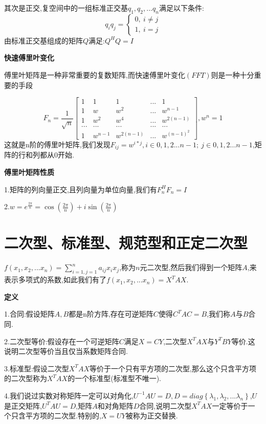 \documentclass[oneside]{book}
\begin{document}
	其次是正交,复空间中的一组标准正交基$q_{1},q_{2},...q_{n}$满足以下条件:
	$$q_{i}q_{j}=\left\{\begin{array}{c}
		0,\ i\neq j\\1,\ i=j
	\end{array}\right.$$
	由标准正交基组成的矩阵$Q$满足:$Q^{H}Q=I$
	
	\textbf{快速傅里叶变化}
	
	傅里叶矩阵是一种非常重要的复数矩阵,而快速傅里叶变化$(FFT)$则是一种十分重要的手段

	$$F_{n}=\frac{1}{\sqrt{n}}\left[\begin{array}{ccccc}
		1&1&1&...&1\\1&w&w^{2}&...&w^{n-1}\\1&w^{2}&w^{4}&...&w^{2(n-1)}\\...&...&...&...&...\\1&w^{n-1}&w^{2(n-1)}&...&w^{(n-1)^{2}}
	\end{array}\right],w^{n}=1$$
	这就是n阶的傅里叶矩阵,我们发现$F_{ij}=w^{i*j},i\in {0,1,2...n-1};\ j\in {0,1,2...n-1}$,矩阵的行和列都从0开始.
	
	\textbf{傅里叶矩阵性质}
	
	1.矩阵的列向量正交,且列向量为单位向量,我们有$F_{n}^{H}F_{n}=I$
	
	2.$w=\textit{e}^{\frac{2\pi}{n}}=\cos(\frac{2\pi}{n})+i\sin(\frac{2\pi}{n})$
	\chapter{二次型、标准型、规范型和正定二次型}
	$f(x_{1},x_{2},...x_{n})=\sum_{i=1,j=1}^{n}a_{ij}x_{i}x_{j}$,称为$n$元二次型,然后我们得到一个矩阵$A$,来表示多项式的系数,如此我们有了$f(x_{1},x_{2},...x_{n})=X^{T}AX$.
	
	\textbf{定义}
	
	1.合同:假设矩阵$A,B$都是n阶方阵,存在可逆矩阵$C$使得$C^{T}AC=B$,我们称$A$与$B$合同.
	
	2.二次型等价:假设存在一个可逆矩阵$C$满足$X=CY$,二次型$X^{T}AX$与$Y^{T}BY$等价.这说明二次型等价当且仅当系数矩阵合同.
	
	3.标准型:假设二次型$X^{T}AX$等价于一个只有平方项的二次型,那么这个只含平方项的二次型称为$X^{T}AX$的一个标准型(标准型不唯一).
	
	4.我们说过实数对称矩阵一定可以对角化,$U^{-1}AU=D,D=diag\left\lbrace \lambda_{1},\lambda_{2},...\lambda_{n}\right\rbrace $,$U$是正交矩阵,$U^{T}AU=D$,矩阵$A$和对角矩阵$D$合同,说明二次型$X^{T}AX$一定等价于一个只含平方项的二次型.特别的,$X=UY$被称为正交替换.
	
\end{document}
